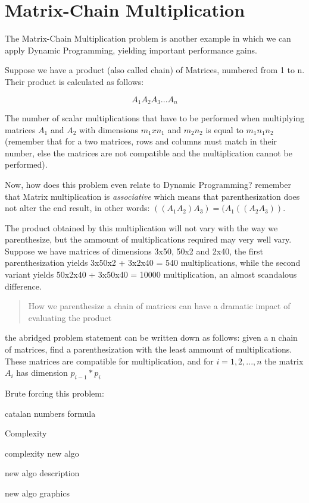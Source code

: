 \section{Matrix-Chain Multiplication}

The Matrix-Chain Multiplication problem is another example in which we can 
apply Dynamic Programming, yielding important performance gains.

Suppose we have a product (also called chain) of Matrices, numbered from 1 to n. Their product is
calculated as follows:

$$A_1A_2A_3...A_n$$

The number of scalar multiplications that have to be performed when multiplying matrices $A_1$
and $A_2$ with dimensions $m_1xn_1$ and $m_2n_2$ is equal to $m_1n_1n_2$ (remember that
for a two matrices, rows and columns must match in their number, else the matrices are not 
compatible and the multiplication cannot be performed). 

Now, how does this problem even relate to Dynamic Programming? remember that Matrix 
multiplication is \emph{associative} which means that parenthesization does not alter
the end result, in other words: $((A_1A_2)A_3) = (A_1((A_2A_3))$.

The product obtained by this multiplication will not vary with the way we parenthesize,
but the ammount of multiplications required may very well vary. Suppose we have
matrices of dimensions 3x50, 50x2 and 2x40, the first parenthesization yields 
3x50x2 + 3x2x40 = 540 multiplications, while the second variant yields
50x2x40 + 3x50x40 = 10000 multiplication, an almost scandalous difference.

\begin{quote}How we parenthesize a chain of matrices can have a dramatic impact of evaluating
the product \cite{cormen2009introduction}\end{quote}

the abridged problem statement can be written down as follows: given a n chain of matrices,
find a parenthesization with the least ammount of multiplications. These matrices are compatible
for multiplication, and for $i = 1, 2, ..., n$ the matrix $A_i$ has dimension $p_{i-1} * p_i$

Brute forcing this problem:


catalan numbers formula


Complexity


complexity new algo

new algo description

new algo graphics